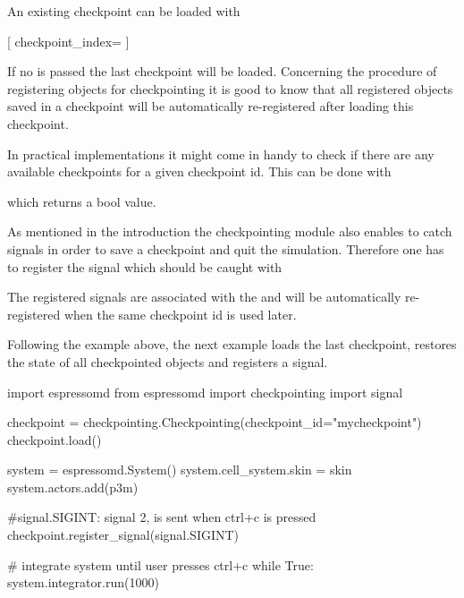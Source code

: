 \vspace{2em}
An existing checkpoint can be loaded with 
\begin{pysyntax}
  [
    checkpoint_index=
  ]
\end{pysyntax}

If no  is passed the last checkpoint will be loaded. 
Concerning the procedure of registering objects for checkpointing it is good 
to know that all registered objects saved in a checkpoint will be 
automatically re-registered after loading this checkpoint.

\vspace{1em}
In practical implementations it might come in handy to check if there are any 
available checkpoints for a given checkpoint id. This can be done with
\begin{pysyntax}
\end{pysyntax}

which returns a bool value.

\vspace{1em}
As mentioned in the introduction the checkpointing module also enables to 
catch signals in order to save a checkpoint and quit the simulation. 
Therefore one has to register the signal which should be caught with
\begin{pysyntax}
\end{pysyntax}

The registered signals are associated with the  and will 
be automatically re-registered when the same checkpoint id is used later.


\vspace{2em}
Following the example above, the next example loads the last checkpoint, 
restores the state of all checkpointed objects and registers a signal.

\begin{pycode}
    import espressomd
    from espressomd import checkpointing
    import signal

    checkpoint = checkpointing.Checkpointing(checkpoint_id="mycheckpoint")
    checkpoint.load()

    system = espressomd.System()
    system.cell_system.skin = skin
    system.actors.add(p3m)

    #signal.SIGINT: signal 2, is sent when ctrl+c is pressed
    checkpoint.register_signal(signal.SIGINT)

    # integrate system until user presses ctrl+c
    while True:
        system.integrator.run(1000)
\end{pycode}

